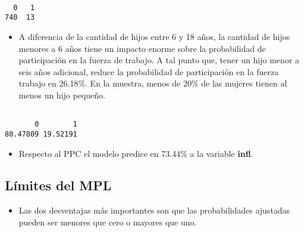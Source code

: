 \documentclass[
  letterpaper,
  DIV=11,
  numbers=noendperiod]{scrreprt}
\newenvironment{Shaded}{\begin{snugshade}}{\end{snugshade}}
\newcommand{\DecValTok}[1]{\textcolor[rgb]{0.68,0.00,0.00}{#1}}
\newcommand{\FunctionTok}[1]{\textcolor[rgb]{0.28,0.35,0.67}{#1}}
\newcommand{\NormalTok}[1]{\textcolor[rgb]{0.00,0.23,0.31}{#1}}
\newcommand{\OtherTok}[1]{\textcolor[rgb]{0.00,0.23,0.31}{#1}}
\newcommand{\SpecialCharTok}[1]{\textcolor[rgb]{0.37,0.37,0.37}{#1}}
\providecommand{\tightlist}{%
  \setlength{\itemsep}{0pt}\setlength{\parskip}{0pt}}\usepackage{longtable,booktabs,array}
\begin{document}
\begin{verbatim}

  0   1 
740  13 
\end{verbatim}

\begin{itemize}
\tightlist
\item
  A diferencia de la cantidad de hijos entre 6 y 18 años, la cantidad de
  hijos menores a 6 años tiene un impacto enorme sobre la probabilidad
  de participación en la fuerza de trabajo. A tal punto que, tener un
  hijo menor a seis años adicional, reduce la probabilidad de
  participación en la fuerza trabajo en 26.18\%. En la muestra, menos de
  20\% de las mujeres tienen al menos un hijo pequeño.
\end{itemize}

\begin{Shaded}
\end{Shaded}

\begin{verbatim}

       0        1 
80.47809 19.52191 
\end{verbatim}

\begin{itemize}
\tightlist
\item
  Respecto al PPC el modelo predice en 73.44\% a la variable
  \textbf{infl}.
\end{itemize}

\subsection{Límites del MPL}\label{luxedmites-del-mpl}

\begin{itemize}
\tightlist
\item
  Las dos desventajas más importantes son que las probabilidades
  ajustadas pueden ser menores que cero o mayores que uno.
\end{itemize}
\end{document}
